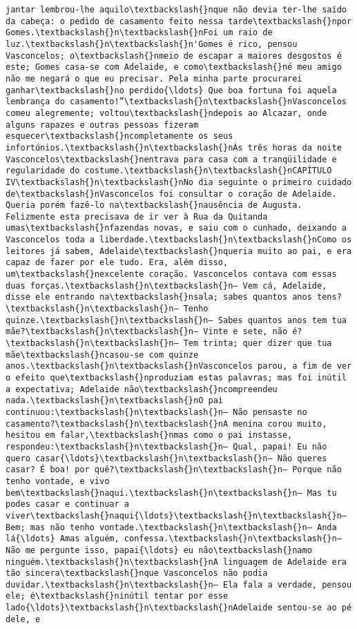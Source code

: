 \begin{Verbatim}[commandchars=\\\{\}]
jantar lembrou-lhe aquilo\textbackslash{}nque não devia ter-lhe saído da cabeça: o pedido de casamento feito nessa tarde\textbackslash{}npor Gomes.\textbackslash{}n\textbackslash{}nFoi um raio de luz.\textbackslash{}n\textbackslash{}n'Gomes é rico, pensou Vasconcelos; o\textbackslash{}nmeio de escapar a maiores desgostos é este; Gomes casa-se com Adelaide, e como\textbackslash{}né meu amigo não me negará o que eu precisar. Pela minha parte procurarei ganhar\textbackslash{}no perdido{\ldots} Que boa fortuna foi aquela lembrança do casamento!”\textbackslash{}n\textbackslash{}nVasconcelos comeu alegremente; voltou\textbackslash{}ndepois ao Alcazar, onde alguns rapazes e outras pessoas fizeram esquecer\textbackslash{}ncompletamente os seus infortúnios.\textbackslash{}n\textbackslash{}nÀs três horas da noite Vasconcelos\textbackslash{}nentrava para casa com a tranqüilidade e regularidade do costume.\textbackslash{}n\textbackslash{}nCAPÍTULO IV\textbackslash{}n\textbackslash{}nNo dia seguinte o primeiro cuidado de\textbackslash{}nVasconcelos foi consultar o coração de Adelaide. Queria porém fazê-lo na\textbackslash{}nausência de Augusta. Felizmente esta precisava de ir ver à Rua da Quitanda umas\textbackslash{}nfazendas novas, e saiu com o cunhado, deixando a Vasconcelos toda a liberdade.\textbackslash{}n\textbackslash{}nComo os leitores já sabem, Adelaide\textbackslash{}nqueria muito ao pai, e era capaz de fazer por ele tudo. Era, além disso, um\textbackslash{}nexcelente coração. Vasconcelos contava com essas duas forças.\textbackslash{}n\textbackslash{}n— Vem cá, Adelaide, disse ele entrando na\textbackslash{}nsala; sabes quantos anos tens?\textbackslash{}n\textbackslash{}n— Tenho quinze.\textbackslash{}n\textbackslash{}n— Sabes quantos anos tem tua mãe?\textbackslash{}n\textbackslash{}n— Vinte e sete, não é?\textbackslash{}n\textbackslash{}n— Tem trinta; quer dizer que tua mãe\textbackslash{}ncasou-se com quinze anos.\textbackslash{}n\textbackslash{}nVasconcelos parou, a fim de ver o efeito que\textbackslash{}nproduziam estas palavras; mas foi inútil a expectativa; Adelaide não\textbackslash{}ncompreendeu nada.\textbackslash{}n\textbackslash{}nO pai continuou:\textbackslash{}n\textbackslash{}n— Não pensaste no casamento?\textbackslash{}n\textbackslash{}nA menina corou muito, hesitou em falar,\textbackslash{}nmas como o pai instasse, respondeu:\textbackslash{}n\textbackslash{}n— Qual, papai! Eu não quero casar{\ldots}\textbackslash{}n\textbackslash{}n— Não queres casar? É boa! por quê?\textbackslash{}n\textbackslash{}n— Porque não tenho vontade, e vivo bem\textbackslash{}naqui.\textbackslash{}n\textbackslash{}n— Mas tu podes casar e continuar a viver\textbackslash{}naqui{\ldots}\textbackslash{}n\textbackslash{}n— Bem; mas não tenho vontade.\textbackslash{}n\textbackslash{}n— Anda lá{\ldots} Amas alguém, confessa.\textbackslash{}n\textbackslash{}n— Não me pergunte isso, papai{\ldots} eu não\textbackslash{}namo ninguém.\textbackslash{}n\textbackslash{}nA linguagem de Adelaide era tão sincera\textbackslash{}nque Vasconcelos não podia duvidar.\textbackslash{}n\textbackslash{}n— Ela fala a verdade, pensou ele; é\textbackslash{}ninútil tentar por esse lado{\ldots}\textbackslash{}n\textbackslash{}nAdelaide sentou-se ao pé dele, e 
\end{Verbatim}
